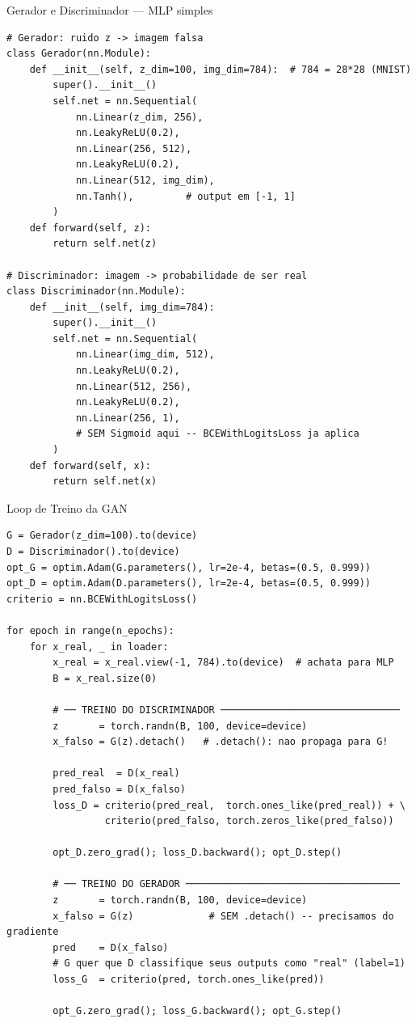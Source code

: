 \documentclass[aspectratio=169, 10pt]{beamer}
\begin{document}
\begin{frame}[fragile]{Gerador e Discriminador — MLP simples}
\begin{lstlisting}
# Gerador: ruido z -> imagem falsa
class Gerador(nn.Module):
    def __init__(self, z_dim=100, img_dim=784):  # 784 = 28*28 (MNIST)
        super().__init__()
        self.net = nn.Sequential(
            nn.Linear(z_dim, 256),
            nn.LeakyReLU(0.2),
            nn.Linear(256, 512),
            nn.LeakyReLU(0.2),
            nn.Linear(512, img_dim),
            nn.Tanh(),         # output em [-1, 1]
        )
    def forward(self, z):
        return self.net(z)

# Discriminador: imagem -> probabilidade de ser real
class Discriminador(nn.Module):
    def __init__(self, img_dim=784):
        super().__init__()
        self.net = nn.Sequential(
            nn.Linear(img_dim, 512),
            nn.LeakyReLU(0.2),
            nn.Linear(512, 256),
            nn.LeakyReLU(0.2),
            nn.Linear(256, 1),
            # SEM Sigmoid aqui -- BCEWithLogitsLoss ja aplica
        )
    def forward(self, x):
        return self.net(x)
\end{lstlisting}
\end{frame}


\begin{frame}[fragile]{Loop de Treino da GAN}
\begin{lstlisting}[style=small]
G = Gerador(z_dim=100).to(device)
D = Discriminador().to(device)
opt_G = optim.Adam(G.parameters(), lr=2e-4, betas=(0.5, 0.999))
opt_D = optim.Adam(D.parameters(), lr=2e-4, betas=(0.5, 0.999))
criterio = nn.BCEWithLogitsLoss()

for epoch in range(n_epochs):
    for x_real, _ in loader:
        x_real = x_real.view(-1, 784).to(device)  # achata para MLP
        B = x_real.size(0)

        # ── TREINO DO DISCRIMINADOR ───────────────────────────────
        z       = torch.randn(B, 100, device=device)
        x_falso = G(z).detach()   # .detach(): nao propaga para G!

        pred_real  = D(x_real)
        pred_falso = D(x_falso)
        loss_D = criterio(pred_real,  torch.ones_like(pred_real)) + \
                 criterio(pred_falso, torch.zeros_like(pred_falso))

        opt_D.zero_grad(); loss_D.backward(); opt_D.step()

        # ── TREINO DO GERADOR ─────────────────────────────────────
        z       = torch.randn(B, 100, device=device)
        x_falso = G(z)             # SEM .detach() -- precisamos do gradiente
        pred    = D(x_falso)
        # G quer que D classifique seus outputs como "real" (label=1)
        loss_G  = criterio(pred, torch.ones_like(pred))

        opt_G.zero_grad(); loss_G.backward(); opt_G.step()
\end{lstlisting}
\end{frame}
\end{document}
